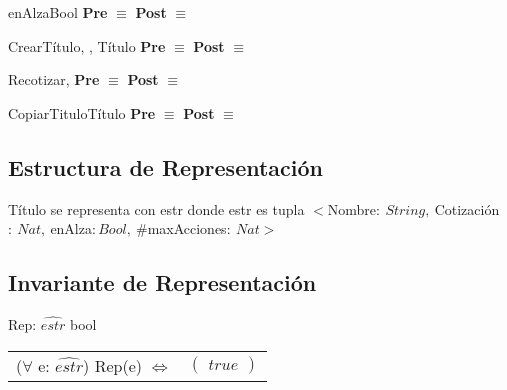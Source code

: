 	\begin{interfaz}{enAlza}{}{Bool}{}
	\textbf{Pre} $\equiv$  
	\textbf{Post} $\equiv$ 
	\end{interfaz}

	\begin{interfaz}{CrearT\'itulo}{, , }{T\'itulo}{}
	\textbf{Pre} $\equiv$ 
	\textbf{Post} $\equiv$ 
	\end{interfaz}

	\begin{interfaz}{Recotizar}{, }{}{}
	\textbf{Pre} $\equiv$  
	\textbf{Post} $\equiv$ 
	\end{interfaz}

	\begin{interfaz}{CopiarTitulo}{}{T\'itulo}{}
	\textbf{Pre} $\equiv$ 
	\textbf{Post} $\equiv$ 
	\end{interfaz}


\subsection{Estructura de Representaci\'on}
	T\'itulo se representa con estr\newline
	donde estr es tupla
		$<$Nombre$: \ String, \ 
		$Cotizaci\'on$: \ Nat, \ $enAlza$: Bool, \  $\#maxAcciones$: \ Nat >$ \\
		
\subsection{Invariante de Representaci\'on}

	\noindent Rep: $\widehat{estr}$ \en bool\\
	\begin{tabular}[t]{@{} r @{} @{} l @{}}
	($\forall$ e: $\widehat{estr}$) Rep(e) $\Leftrightarrow$&
	$				
	\left(
	\begin{array}{l}
	true
	\end{array} 
	\right)$\\
	\end{tabular}\\\\


